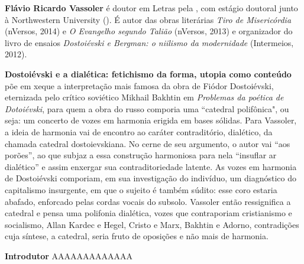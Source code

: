 
\textbf{Flávio Ricardo Vassoler} é doutor em Letras pela , com estágio doutoral junto à
  Northwestern University (). É autor das obras literárias \emph{Tiro
  de Misericórdia} (nVersos, 2014) e \emph{O Evangelho segundo Talião}
  (nVersos, 2013) e organizador do livro de ensaios \emph{Dostoiévski e
  Bergman: o niilismo da modernidade} (Intermeios, 2012).

\textbf{Dostoiévski e a dialética: fetichismo da forma, utopia como conteúdo} põe em xeque a interpretação mais famosa da obra de Fiódor Dostoiévski, eternizada pelo crítico soviético Mikhail Bakhtin em \emph{Problemas da poética de Dotoiévski}, para quem a obra do russo comporia uma ``catedral polifônica", ou seja: um concerto de vozes em harmonia erigida em bases sólidas. Para Vassoler, a ideia de harmonia vai de encontro ao caráter contraditório, dialético, da chamada catedral dostoievskiana. No cerne de seu argumento, o autor vai “aos porões”, ao que subjaz a essa construção harmoniosa para nela “insuflar ar dialético” e assim enxergar sua contraditoriedade latente. As vozes em harmonia de Dostoiévski comporiam, em sua investigação do indivíduo, um diagnóstico do capitalismo insurgente, em que o sujeito é também súdito: esse coro estaria abafado, enforcado pelas cordas vocais do subsolo. Vassoler então ressignifica a catedral e pensa uma polifonia dialética, vozes que contraporiam cristianismo e socialismo, Allan Kardec e Hegel, Cristo e Marx, Bakhtin e Adorno, contradições cuja síntese, a catedral, seria fruto de oposições e não mais de harmonia.  

\textbf{Introdutor} AAAAAAAAAAAAA\par





